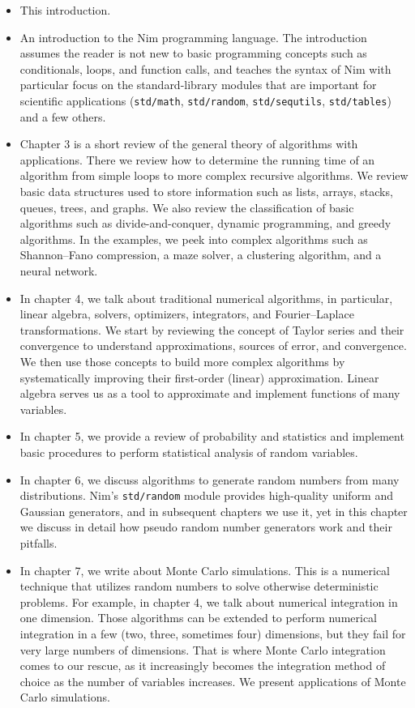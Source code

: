 \documentclass[justified, sixbynine]{tufte-book}
\def\ft{\small\tt}
\theoremstyle{plain}%
\newtheorem * {corollary}{Corollary}
\theoremstyle{definition}
\theoremstyle{remark}
\newtheorem * {remark}{Remark}
\newtheorem * {note}{Note}
\begin{document}
\begin{fullwidth}
\begin{itemize}
\item This introduction.
\item An introduction to the Nim programming language. The introduction assumes the reader is not new to basic programming concepts such as conditionals, loops, and function calls, and teaches the syntax of Nim with particular focus on the standard-library modules that are important for scientific applications ({\ft std/math}, {\ft std/random}, {\ft std/sequtils}, {\ft std/tables}) and a few others.
\item Chapter 3 is a short review of the general theory of algorithms with applications. There we review how to determine the running time of an algorithm from simple loops to more complex recursive algorithms. We review basic data structures used to store information such as lists, arrays, stacks, queues, trees, and graphs. We also review the classification of basic algorithms such as divide-and-conquer, dynamic programming, and greedy algorithms. In the examples, we peek into complex algorithms such as Shannon--Fano compression, a maze solver, a clustering algorithm, and a neural network.
\item In chapter 4, we talk about traditional numerical algorithms, in particular, linear algebra, solvers, optimizers, integrators, and Fourier--Laplace transformations. We start by reviewing the concept of Taylor series and their convergence to understand approximations, sources of error, and convergence. We then use those concepts to build more complex algorithms by systematically improving their first-order (linear) approximation. Linear algebra serves us as a tool to approximate and implement functions of many variables.
\item In chapter 5, we provide a review of probability and statistics and implement basic procedures to perform statistical analysis of random variables.
\item In chapter 6, we discuss algorithms to generate random numbers from many distributions. Nim's {\ft std/random} module provides high-quality uniform and Gaussian generators, and in subsequent chapters we use it, yet in this chapter we discuss in detail how pseudo random number generators work and their pitfalls.
\item In chapter 7, we write about Monte Carlo simulations. This is a numerical technique that utilizes random numbers to solve otherwise deterministic problems. For example, in chapter 4, we talk about numerical integration in one dimension. Those algorithms can be extended to perform numerical integration in a few (two, three, sometimes four) dimensions, but they fail for very large numbers of dimensions. That is where Monte Carlo integration comes to our rescue, as it increasingly becomes the integration method of choice as the number of variables increases. We present applications of Monte Carlo simulations.


\end{itemize}
\end{fullwidth}
\end{document}
